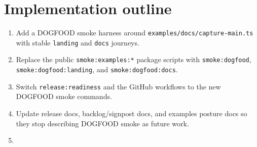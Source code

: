 \section{Implementation outline}\label{record-201-implementation-outline}

\begin{enumerate}
\def\labelenumi{\arabic{enumi}.}
\tightlist
\item
  Add a DOGFOOD smoke harness around \texttt{e\allowbreak{}x\allowbreak{}a\allowbreak{}m\allowbreak{}p\allowbreak{}l\allowbreak{}e\allowbreak{}s\allowbreak{}/\allowbreak{}d\allowbreak{}o\allowbreak{}c\allowbreak{}s\allowbreak{}/\allowbreak{}c\allowbreak{}a\allowbreak{}p\allowbreak{}t\allowbreak{}u\allowbreak{}r\allowbreak{}e\allowbreak{}-\allowbreak{}m\allowbreak{}a\allowbreak{}i\allowbreak{}n\allowbreak{}.\allowbreak{}t\allowbreak{}s} with stable \texttt{l\allowbreak{}a\allowbreak{}n\allowbreak{}d\allowbreak{}i\allowbreak{}n\allowbreak{}g} and \texttt{d\allowbreak{}o\allowbreak{}c\allowbreak{}s} journeys.
\item
  Replace the public \texttt{s\allowbreak{}m\allowbreak{}o\allowbreak{}k\allowbreak{}e\allowbreak{}:\allowbreak{}e\allowbreak{}x\allowbreak{}a\allowbreak{}m\allowbreak{}p\allowbreak{}l\allowbreak{}e\allowbreak{}s\allowbreak{}:\allowbreak{}*} package scripts with \texttt{s\allowbreak{}m\allowbreak{}o\allowbreak{}k\allowbreak{}e\allowbreak{}:\allowbreak{}d\allowbreak{}o\allowbreak{}g\allowbreak{}f\allowbreak{}o\allowbreak{}o\allowbreak{}d}, \texttt{s\allowbreak{}m\allowbreak{}o\allowbreak{}k\allowbreak{}e\allowbreak{}:\allowbreak{}d\allowbreak{}o\allowbreak{}g\allowbreak{}f\allowbreak{}o\allowbreak{}o\allowbreak{}d\allowbreak{}:\allowbreak{}l\allowbreak{}a\allowbreak{}n\allowbreak{}d\allowbreak{}i\allowbreak{}n\allowbreak{}g}, and \texttt{s\allowbreak{}m\allowbreak{}o\allowbreak{}k\allowbreak{}e\allowbreak{}:\allowbreak{}d\allowbreak{}o\allowbreak{}g\allowbreak{}f\allowbreak{}o\allowbreak{}o\allowbreak{}d\allowbreak{}:\allowbreak{}d\allowbreak{}o\allowbreak{}c\allowbreak{}s}.
\item
  Switch \texttt{r\allowbreak{}e\allowbreak{}l\allowbreak{}e\allowbreak{}a\allowbreak{}s\allowbreak{}e\allowbreak{}:\allowbreak{}r\allowbreak{}e\allowbreak{}a\allowbreak{}d\allowbreak{}i\allowbreak{}n\allowbreak{}e\allowbreak{}s\allowbreak{}s} and the GitHub workflows to the new DOGFOOD smoke commands.
\item
  Update release docs, backlog/signpost docs, and examples posture docs so they stop describing DOGFOOD smoke as future work.
\item

\end{enumerate}
